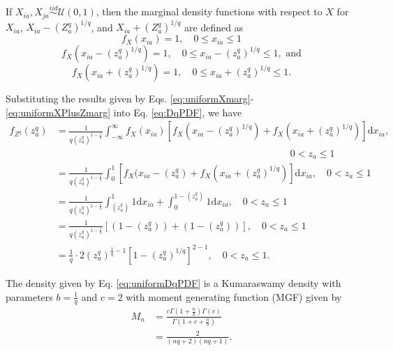\documentclass[10pt,letterpaper]{article}\usepackage[]{graphicx}\usepackage[]{color}
\begin{document}
If $X_{ia},X_{ja} \overset{iid}{\sim} \mathcal{U}(0,1)$, then the marginal density functions with respect to $X$ for $X_{ia}$, $X_{ia} - \left(Z^q_a\right)^{1/q}$, and $X_{ia} + \left(Z^q_a\right)^{1/q}$ are defined as
%
\begin{equation}\label{eq:uniformXmarg}
f_X(x_{ia}) = 1, \quad 0 \leq x_{ia} \leq 1
\end{equation}
%
\begin{equation}\label{eq:uniformXMinusZmarg}
f_X\left(x_{ia} - \left(z^q_a\right)^{1/q}\right) = 1, \quad 0 \leq x_{ia} - \left(z^q_a\right)^{1/q} \leq 1, \text{ and}
\end{equation}
%
\begin{equation}\label{eq:uniformXPlusZmarg}
f_X\left(x_{ia} + \left(z^q_a\right)^{1/q}\right) = 1, \quad 0 \leq x_{ia} + \left(z^q_a\right)^{1/q} \leq 1.
\end{equation}

Substituting the results given by Eqs. \ref{eq:uniformXmarg}-\ref{eq:uniformXPlusZmarg} into Eq. \ref{eq:DqPDF}, we have
%
\begin{equation}\label{eq:uniformDqPDF}
\begin{aligned}
f_{Z^q}(z^q_a) &= \frac{1}{q\left(z^q_a\right)^{1 - \frac{1}{q}}}\int_{-\infty}^{\infty}f_X(x_{ia})\left[f_X\left(x_{ia} - \left(z^q_a\right)^{1/q}\right) + f_X\left(x_{ia} + \left(z^q_a\right)^{1/q}\right)\right]\text{d}x_{ia},\\
& \hspace{4in} 0 < z_a \leq 1\\
&= \frac{1}{q\left(z^q_a\right)^{1 - \frac{1}{q}}}\int_{0}^{1}[f_X(x_{ia} - \left(z^q_a\right) + f_X\left(x_{ia} + \left(z^q_a\right)^{1/q}\right)]\text{d}x_{ia}, \quad 0 < z_a \leq 1 \\
&= \frac{1}{q\left(z^q_a\right)^{1 - \frac{1}{q}}}\int_{\left(z^q_a\right)}^{1}1\text{d}x_{ia} + \int_{0}^{1 - \left(z^q_a\right)}1\text{d}x_{ia}, \quad 0 < z_a \leq 1 \\
&= \frac{1}{q\left(z^q_a\right)^{1 - \frac{1}{q}}}\left[\left(1 - \left(z^q_a\right)\right) + \left(1 - \left(z^q_a\right)\right)\right], \quad 0 < z_a \leq 1 \\
&= \frac{1}{q} \cdot 2 \left(z^q_a\right)^{\frac{1}{q} - 1}\left[1 - \left(z^q_a\right)^{1/q}\right]^{2 - 1}, \quad 0 < z_a \leq 1.
\end{aligned}
\end{equation}

The density given by Eq. \ref{eq:uniformDqPDF} is a Kumaraswamy density with parameters $b = \frac{1}{q}$ and $c = 2$ with moment generating function (MGF) given by
%
\begin{equation}\label{eq:uniformDqMGF}
\begin{aligned}
M_n &=  \frac{c\Gamma\left(1 + \frac{n}{b}\right) \Gamma(c)}{\Gamma\left(1 + c + \frac{n}{b}\right)}\\
&= \frac{2}{(nq + 2)(nq + 1)}.
\end{aligned}
\end{equation}
\end{document}
